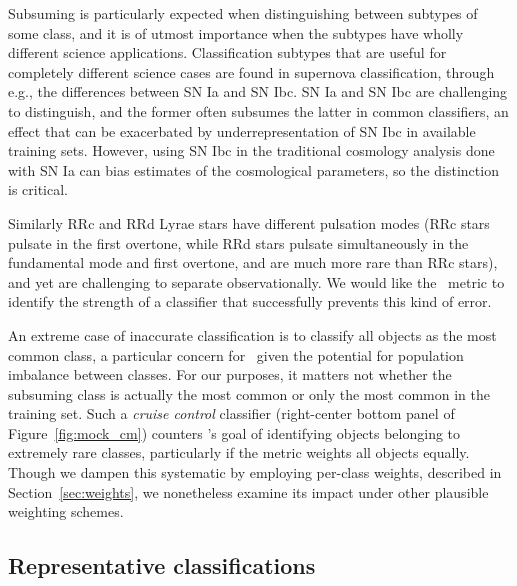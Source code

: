 Subsuming is particularly expected when distinguishing between subtypes of some class, and it is of utmost importance when the subtypes have wholly different science applications.
Classification subtypes that are useful for completely different science cases are found in supernova classification, through e.g., the differences between SN Ia and SN Ibc. SN Ia and SN Ibc are challenging to distinguish, and the former often subsumes the latter in common classifiers, an effect that can be exacerbated by underrepresentation of SN Ibc in available training sets.
However, using SN Ibc in the traditional cosmology analysis done with SN Ia can bias estimates of the cosmological parameters, so the distinction is critical.

Similarly RRc and RRd Lyrae stars have different pulsation modes (RRc stars pulsate in the first overtone, while RRd stars pulsate simultaneously in the fundamental mode and first overtone, and are much more rare than RRc stars), and yet are challenging to separate observationally.
We would like the \plasticc\ metric to identify the strength of a classifier that successfully prevents this kind of error.

An extreme case of inaccurate classification is to classify all objects as the most common class, a particular concern for \plasticc\ given the potential for population imbalance between classes.
For our purposes, it matters not whether the subsuming class is actually the most common or only the most common in the training set.
Such a \textit{cruise control} classifier (right-center bottom panel of Figure~\ref{fig:mock_cm}) counters \plasticc's goal of identifying objects belonging to extremely rare classes, particularly if the metric weights all objects equally.
Though we dampen this systematic by employing per-class weights, described in Section~\ref{sec:weights}, we nonetheless examine its impact under other plausible weighting schemes.

%

\subsection{Representative classifications}
\label{sec:realdata}


